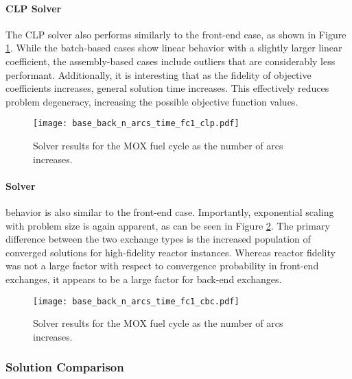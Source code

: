 \paragraph{CLP Solver}

The CLP solver also performs similarly to the front-end case, as shown in Figure
\ref{fig:base_back_n_arcs_time_fc1_clp}. While the batch-based cases show linear
behavior with a slightly larger linear coefficient, the assembly-based cases
include outliers that are considerably less performant. Additionally, it is
interesting that as the fidelity of objective coefficients increases, general
solution time increases. This effectively reduces problem degeneracy, increasing
the possible objective function values.

\begin{figure}[h!]
  \begin{center}
    \texttt{[image: base\_back\_n\_arcs\_time\_fc1\_clp.pdf]}
    \caption{
      \label{fig:base_back_n_arcs_time_fc1_clp}
      \clp Solver results for the MOX fuel cycle as the number of arcs
      increases.      
    }
  \end{center}
\end{figure}

\paragraph{\cbc Solver}

\cbc behavior is also similar to the front-end case. Importantly, exponential
scaling with problem size is again apparent, as can be seen in Figure
\ref{fig:base_back_n_arcs_time_fc1_cbc}. The primary difference between the two
exchange types is the increased population of converged solutions for
high-fidelity reactor instances. Whereas reactor fidelity was not a large factor
with respect to convergence probability in front-end exchanges, it appears to be
a large factor for back-end exchanges.
 
\begin{figure}[h!]
  \begin{center}
    \texttt{[image: base\_back\_n\_arcs\_time\_fc1\_cbc.pdf]}
    \caption{
      \label{fig:base_back_n_arcs_time_fc1_cbc}
      \cbc Solver results for the MOX fuel cycle as the number of arcs
      increases.      
    }
  \end{center}
\end{figure}

\subsubsection{Solution Comparison}\label{sec:res:scale:front:soln}

